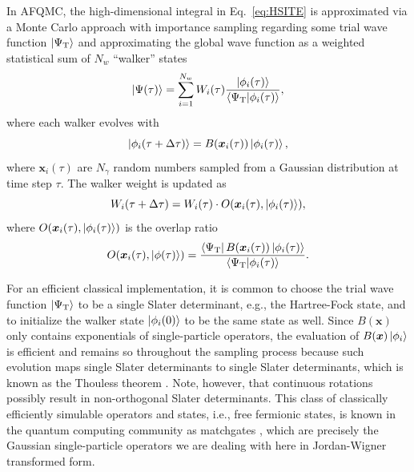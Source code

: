 \documentclass[../main.tex]{subfiles}
\begin{document}
In AFQMC, the high-dimensional integral in  Eq.~\ref{eq:HSITE} is approximated via a Monte Carlo approach with importance sampling regarding some trial wave function $\ket{\Psi_\mathrm{T}}$ and approximating the global wave function as a weighted statistical sum of $N_w$ ``walker'' states 
\begin{equation}
    \ket{\Psi(\tau)} = \sum_{i=1}^{N_w} W_i(\tau) \frac{\ket{\phi_i(\tau)}}{\braket{\Psi_\mathrm{T}}{\phi_i(\tau)}},
\end{equation} where each walker evolves with
\begin{equation}
    \ket{\phi_i(\tau + \Delta \tau)} = B(\bm{x}_i(\tau)) \ket{\phi_i(\tau)},
\end{equation} where $\bm{x}_i(\tau)$ are $N_\gamma$ random numbers sampled from a Gaussian distribution at time step $\tau$.
The walker weight is updated as
\begin{equation}
    W_i(\tau + \Delta \tau) = W_i(\tau) \cdot O(\bm{x}_i(\tau), \ket{\phi_i(\tau)}),
\end{equation} where $ O(\bm{x}_i(\tau), \ket{\phi_i(\tau)})$ is the overlap ratio
\begin{equation}\label{eq:overlapratio}
     O(\bm{x}_i(\tau), \ket{\phi(\tau)}) = \frac{\bra{\Psi_\mathrm{T}} B(\bm{x}_i(\tau)) \ket{\phi_i(\tau)}}  {\braket{\Psi_\mathrm{T}}{\phi_i(\tau)}}.
\end{equation} 

For an efficient classical implementation, it is common to choose the trial wave function $\ket{\Psi_\mathrm{T}}$ to be a single Slater determinant, e.g., the Hartree-Fock state, and to initialize the walker state $\ket{\phi_i(0)}$ to be the same state as well. Since $B(\bm{x})$ only contains exponentials of single-particle operators, the evaluation of $B(\bm{x})\ket{\phi_i}$ is efficient and remains so throughout the sampling process because such evolution maps single Slater determinants to single Slater determinants, which is known as the Thouless theorem \cite{thouless1960stability}. Note, however, that continuous rotations possibly result in non-orthogonal Slater determinants. This class of classically efficiently simulable operators and states, i.e., free fermionic states, is known in the quantum computing community as matchgates \cite{jozsa2008matchgates}, which are precisely the Gaussian single-particle operators we are dealing with here in Jordan-Wigner transformed form.
\end{document}
